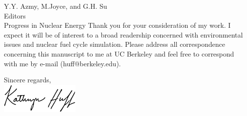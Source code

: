 \documentclass[10pt]{letter} %
\begin{document}
\begin{letter}{Y.Y. Azmy, M.Joyce, and G.H. Su\\
Editors\\
Progress in Nuclear Energy}
Thank you for your consideration of my work.  I expect it will be of interest
to a broad readership concerned with environmental issues and nuclear fuel
cycle simulation.  Please address all correspondence concerning this manuscript
to me at UC Berkeley and feel free to correspond with me by e-mail
(huff@berkeley.edu).

\closing{Sincere regards,\\\vspace{-22mm}%
\includegraphics[height=1.5cm]{signature.eps}\\
}

\end{letter}
\end{document}
